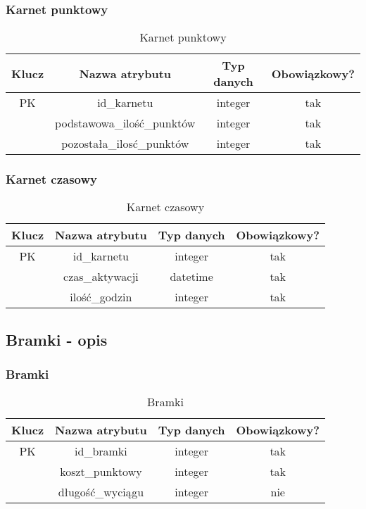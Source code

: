 \subsubsection{Karnet punktowy}
\begin{table}[H]
	\centering
	\begin{tabular}{|c|c|c|c|}
		\hline
		Klucz & Nazwa atrybutu                & Typ danych & Obowiązkowy? \\ \hline
		PK    & id\_karnetu                   & integer    & tak           \\ \hline
		      & podstawowa\_ilość\_punktów & integer    & tak           \\ \hline
		      & pozostała\_ilosć\_punktów  & integer    & tak           \\ \hline
	\end{tabular}
	\caption{Karnet punktowy}
\end{table}

\subsubsection{Karnet czasowy}
\begin{table}[H]
	\centering
	\begin{tabular}{|c|c|c|c|}
		\hline
		Klucz & Nazwa atrybutu  & Typ danych & Obowiązkowy? \\ \hline
		PK    & id\_karnetu     & integer    & tak           \\ \hline
		      & czas\_aktywacji & datetime   & tak           \\ \hline
		      & ilość\_godzin & integer    & tak           \\ \hline 
	\end{tabular}
	\caption{Karnet czasowy}
\end{table}

\subsection{Bramki - opis}
\subsubsection{Bramki}
\begin{table}[H]
	\centering
	\begin{tabular}{|c|c|c|c|}
		\hline
		Klucz & Nazwa atrybutu       & Typ danych & Obowiązkowy? \\ \hline
		PK    & id\_bramki           & integer    & tak           \\ \hline
		      & koszt\_punktowy      & integer    & tak           \\ \hline
		      & długość\_wyciągu & integer    & nie           \\ \hline
	\end{tabular}
	\caption{Bramki}
\end{table}

